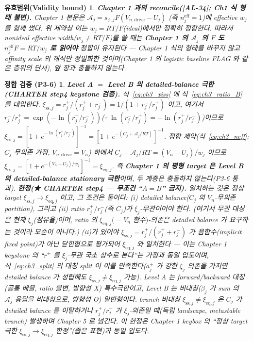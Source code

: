 \documentclass[11pt,a4paper]{article}
\newtheorem*{boundbox}{유효범위(Validity bound)}
\newtheorem*{verifybox}{정합 검증 (P3-6)}
\newcommand{\eff}{\mathrm{eff}}
\newcommand{\eq}{\mathrm{eq}}
\newcommand{\drive}{\mathrm{drive}}
\newcommand{\sstat}{\mathrm{ss}}
\newcommand{\AL}[1]{\textsf{[AL-#1]}}
\begin{document}
\begin{boundbox}
\textbf{Chapter 1 과의 reconcile(\AL{34}; Ch1 식 형태 불변).} Chapter 1 본문은 $\mathcal A_j=s_{\phi,j}F(V_{n,\drive}-U_j)$
(즉 $n_j^{\eff}=1$)에 \emph{effective} $w_j$ 를 함께 썼다. 위 제약상 이는 $w_j=RT/F$(ideal)에서만 정확히
정합한다. 따라서 nonideal effective width($w_j\ne RT/F$)를 쓸 때는 \textbf{Chapter 1 의 $\mathcal A_j$ 의 $F$ 도
$n_j^{\eff}F=RT/w_j$ 로 읽어야} 정합이 유지된다 — Chapter 1 식의 \emph{형태}를 바꾸지 않고 affinity scale 의
\emph{해석}만 정밀화한 것이며(Chapter 1 의 logistic baseline FLAG 와 같은 층위의 단서), 앞 장과 충돌하지 않는다.
\end{boundbox}

\begin{verifybox}
\textbf{Level A $=$ Level B 의 detailed-balance 극한 (CHARTER step4 keystone 검증).} 식~\eqref{eq:ch3_xiss} 에
식~\eqref{eq:ch3_ratio_B} 를 대입한다. $\xi_{\sstat,j}=r_j^+/(r_j^++r_j^-)=1/(1+r_j^-/r_j^+)$ 이고, 여기서
$r_j^-/r_j^+=\exp(-\ln(r_j^+/r_j^-))$($\because\ \ln(r_j^-/r_j^+)=-\ln(r_j^+/r_j^-)$)이므로
$\xi_{\sstat,j}=[1+e^{-\ln(r_j^+/r_j^-)}]^{-1}=[1+e^{-(C_j+\mathcal A_j/RT)}]^{-1}$. 정합 제약(식~\eqref{eq:ch3_neff}; $C_j$ 무의존 가정, $V_{n,\drive}=V_n$)
하에서 $C_j+\mathcal A_j/RT=(V_n-U_j)/w_j$ 이므로 $\xi_{\sstat,j}=[1+e^{-(V_n-U_j)/w_j}]^{-1}=\xi_{\eq,j}$. 즉
\textbf{Chapter 1 의 평형 target 은 Level B 의 detailed-balance \emph{stationary 극한}}이며, 두 계층은 충돌하지
않는다(P3-6 통과). \textbf{한정(★ CHARTER step4 — 무조건 ``$A=B$'' 금지).} 일치하는 것은 \emph{정상 target}
$\xi_{\sstat,j}\to\xi_{\eq,j}$ 이고, 그 조건은 \emph{둘}이다: (i) detailed balance($C_j$ 의 $V_n$-무의존 partition),
\emph{그리고} (ii) ratio $r_j^+/r_j^-$(즉 $C_j$)가 $\xi_j$\emph{-무관}이어야 한다. (여기서 무관 대상은 \emph{현재}
$\xi_j$(점유율)이며, ratio 의 $\xi_{\eq,j}(=V_n$ 함수$)$-의존은 detailed balance 가 \emph{요구}하는 것이라
모순이 아니다.) (ii)가 있어야 $\xi_{\sstat,j}=
r_j^+/(r_j^++r_j^-)$ 가 음함수(implicit fixed point)가 아닌 \emph{닫힌형}으로 평가되어 $\xi_{\eq,j}$ 와 일치한다
— 이는 Chapter 1 keystone 의 ``$r^\pm$ 를 $\xi_j$-무관 국소 상수로 본다''는 가정과 \emph{동일 입도}이며,
식~\eqref{eq:ch3_split} 의 대칭 split 이 이를 만족한다($a_j^\pm$ 가 강한 $\xi_j$ 의존을 가지면 detailed balance 가
성립해도 $\xi_{\sstat,j}\ne\xi_{\eq,j}$ 가능). Level A 는 forward/backward \emph{대칭}(공통 배율, ratio 불변,
방향성 X) 특수극한이고, Level B 는 \emph{비대칭}($\beta_j$ 가 sum 의 $\mathcal A_j$-응답을 비대칭으로, 방향성 O)
일반형이다. branch 비대칭 $\xi_{\sstat,j}\ne\xi_{\eq,j}$ 은 $C_j$ 가 detailed balance 를 이탈하거나 $r_j^+/r_j^-$ 가
$\xi_j$-의존일 때(독립 landscape, metastable branch) 발생하며 Chapter 5 로 넘긴다. 이 한정은
Chapter 1 keybox 의 ``정상 target 극한 $\xi_{\sstat,j}\to\xi_{\eq,j}$ 한정''(좁은 표현)과 \emph{동일 입도}다.
\end{verifybox}
\end{document}
